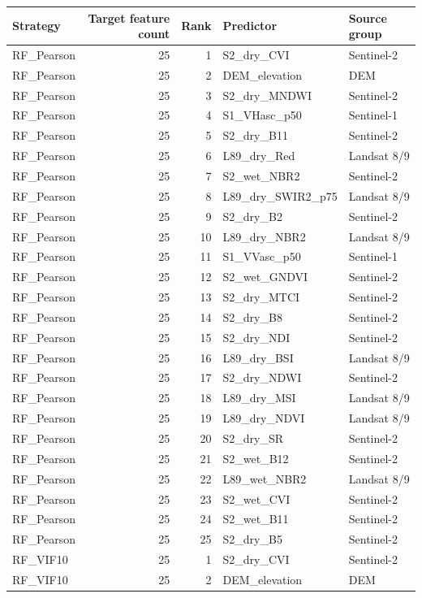 \begin{tabular}{lrrll}
\toprule
Strategy & Target feature count & Rank & Predictor & Source group \\
\midrule
RF_Pearson & 25 & 1 & S2_dry_CVI & Sentinel-2 \\
RF_Pearson & 25 & 2 & DEM_elevation & DEM \\
RF_Pearson & 25 & 3 & S2_dry_MNDWI & Sentinel-2 \\
RF_Pearson & 25 & 4 & S1_VHasc_p50 & Sentinel-1 \\
RF_Pearson & 25 & 5 & S2_dry_B11 & Sentinel-2 \\
RF_Pearson & 25 & 6 & L89_dry_Red & Landsat 8/9 \\
RF_Pearson & 25 & 7 & S2_wet_NBR2 & Sentinel-2 \\
RF_Pearson & 25 & 8 & L89_dry_SWIR2_p75 & Landsat 8/9 \\
RF_Pearson & 25 & 9 & S2_dry_B2 & Sentinel-2 \\
RF_Pearson & 25 & 10 & L89_dry_NBR2 & Landsat 8/9 \\
RF_Pearson & 25 & 11 & S1_VVasc_p50 & Sentinel-1 \\
RF_Pearson & 25 & 12 & S2_wet_GNDVI & Sentinel-2 \\
RF_Pearson & 25 & 13 & S2_dry_MTCI & Sentinel-2 \\
RF_Pearson & 25 & 14 & S2_dry_B8 & Sentinel-2 \\
RF_Pearson & 25 & 15 & S2_dry_NDI & Sentinel-2 \\
RF_Pearson & 25 & 16 & L89_dry_BSI & Landsat 8/9 \\
RF_Pearson & 25 & 17 & S2_dry_NDWI & Sentinel-2 \\
RF_Pearson & 25 & 18 & L89_dry_MSI & Landsat 8/9 \\
RF_Pearson & 25 & 19 & L89_dry_NDVI & Landsat 8/9 \\
RF_Pearson & 25 & 20 & S2_dry_SR & Sentinel-2 \\
RF_Pearson & 25 & 21 & S2_wet_B12 & Sentinel-2 \\
RF_Pearson & 25 & 22 & L89_wet_NBR2 & Landsat 8/9 \\
RF_Pearson & 25 & 23 & S2_wet_CVI & Sentinel-2 \\
RF_Pearson & 25 & 24 & S2_wet_B11 & Sentinel-2 \\
RF_Pearson & 25 & 25 & S2_dry_B5 & Sentinel-2 \\
RF_VIF10 & 25 & 1 & S2_dry_CVI & Sentinel-2 \\
RF_VIF10 & 25 & 2 & DEM_elevation & DEM \\

\end{tabular}
